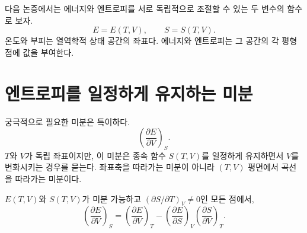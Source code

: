 다음 논증에서는 에너지와 엔트로피를 서로 독립적으로 조절할 수 있는 두 변수의 함수로 보자.
\begin{equation}
 E=E(T,V),
 \qquad
 S=S(T,V).
 \label{eq:sm5-dependent-functions}
\end{equation}
온도와 부피는 열역학적 상태 공간의 좌표다. 에너지와 엔트로피는 그 공간의 각 평형점에 값을 부여한다.

\section{엔트로피를 일정하게 유지하는 미분}

궁극적으로 필요한 미분은 특이하다.
\[
 \left(\frac{\partial E}{\partial V}\right)_S.
\]
\(T\)와 \(V\)가 독립 좌표이지만, 이 미분은 종속 함수 \(S(T,V)\)를 일정하게 유지하면서 \(V\)를 변화시키는 경우를 묻는다. 좌표축을 따라가는 미분이 아니라 \((T,V)\) 평면에서 곡선을 따라가는 미분이다.

\begin{classroomqa}
\end{classroomqa}

\begin{lemma}\(E(T,V)\)와 \(S(T,V)\)가 미분 가능하고 \((\partial S/\partial T)_V\neq0\)인 모든 점에서,
\begin{equation}
 \left(\frac{\partial E}{\partial V}\right)_S
 =
 \left(\frac{\partial E}{\partial V}\right)_T
 -
 \left(\frac{\partial E}{\partial S}\right)_V
 \left(\frac{\partial S}{\partial V}\right)_T.
 \label{eq:sm5-calculus-lemma}
\end{equation}\end{lemma}

